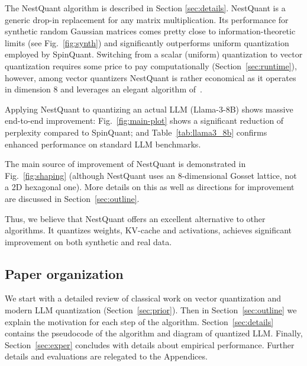 The NestQuant algorithm is described in Section \ref{sec:details}. NestQuant is a generic drop-in replacement for any matrix multiplication. Its performance for synthetic random Gaussian matrices comes pretty close to information-theoretic limits (see Fig.~\ref{fig:synth}) and significantly outperforms uniform quantization employed by SpinQuant. Switching from a scalar (uniform) quantization to vector quantization requires some price to pay computationally (Section~\ref{sec:runtime}), however, among vector quantizers NestQuant is rather economical as it operates in dimension 8 and leverages an elegant algorithm of~\citep{ConwaySloane83}.

Applying NestQuant to quantizing an actual LLM (Llama-3-8B) shows massive end-to-end improvement: Fig.~\ref{fig:main-plot} shows a significant reduction of perplexity compared to SpinQuant; and Table~\ref{tab:llama3_8b} confirms enhanced performance on standard LLM benchmarks.

The main source of improvement of NestQuant is demonstrated in Fig.~\ref{fig:shaping} (although NestQuant uses an 8-dimensional Gosset lattice, not a 2D hexagonal one). More details on this as well as directions for improvement are discussed in Section~\ref{sec:outline}.

Thus, we believe that NestQuant offers an excellent alternative to other algorithms. It quantizes weights, KV-cache and activations, achieves significant improvement on both synthetic and real data.

\subsection{Paper organization}

We start with a detailed review of classical work on vector quantization and modern LLM quantization (Section~\ref{sec:prior}). Then in Section~\ref{sec:outline} we explain the motivation for each step of the algorithm. Section~\ref{sec:details} contains the pseudocode of the algorithm and diagram of quantized LLM. Finally, Section~\ref{sec:exper} concludes with details about empirical performance. Further details and evaluations are relegated to the Appendices.
